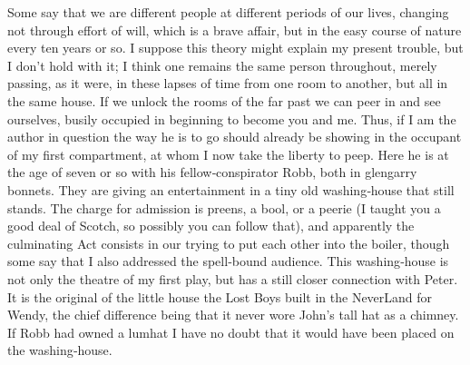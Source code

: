 Some say that we are different people at different periods of our lives,
changing not through effort of will, which is a brave affair,
but in the easy course of nature every ten years or so.
I suppose this theory might explain my present trouble, but I don’t hold with it;
I think one remains the same person throughout,
merely passing, as it were, in these lapses of time from one room to another,
but all in the same house.
If we unlock the rooms of the far past we can peer in and see ourselves,
busily occupied in beginning to become you and me.
Thus, if I am the author in question
the way he is to go should already be showing in the occupant of my first compartment,
at whom I now take the liberty to peep.
Here he is at the age of seven or so with his fellow‐conspirator Robb, both in glengarry bonnets.
They are giving an entertainment in a tiny old washing‐house that still stands.
The charge for admission is preens, a bool, or a peerie
(I taught you a good deal of Scotch, so possibly you can follow that),
and apparently the culminating Act consists in our trying to put each other into the boiler,
though some say that I also addressed the spell‐bound audience.
This washing‐house is not only the theatre of my first play,
but has a still closer connection with Peter.
It is the original of the little house the Lost Boys built in the NeverLand for Wendy,
the chief difference being that it never wore John’s tall hat as a chimney.
If Robb had owned a lumhat I have no doubt that it would have been placed on the washing‐house.

